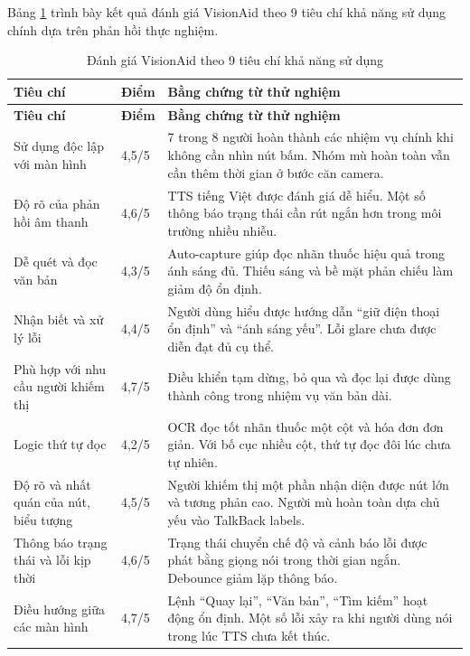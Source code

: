 \documentclass[a4paper,13pt]{report}
\begin{document}
Bảng \ref{tab:usability-criteria} trình bày kết quả đánh giá VisionAid theo 9 tiêu chí khả năng sử dụng chính dựa trên phản hồi thực nghiệm.

\begin{longtable}{p{}p{}p{}}
\caption{Đánh giá VisionAid theo 9 tiêu chí khả năng sử dụng} \label{tab:usability-criteria} \\
\toprule
\textbf{Tiêu chí} & \textbf{Điểm} & \textbf{Bằng chứng từ thử nghiệm} \\
\midrule
\endfirsthead
\toprule
\textbf{Tiêu chí} & \textbf{Điểm} & \textbf{Bằng chứng từ thử nghiệm} \\
\midrule
\endhead
Sử dụng độc lập với màn hình & 4,5/5 & 7 trong 8 người hoàn thành các nhiệm vụ chính khi không cần nhìn nút bấm. Nhóm mù hoàn toàn vẫn cần thêm thời gian ở bước căn camera. \\ \hline
Độ rõ của phản hồi âm thanh & 4,6/5 & TTS tiếng Việt được đánh giá dễ hiểu. Một số thông báo trạng thái cần rút ngắn hơn trong môi trường nhiều nhiễu. \\ \hline
Dễ quét và đọc văn bản & 4,3/5 & Auto-capture giúp đọc nhãn thuốc hiệu quả trong ánh sáng đủ. Thiếu sáng và bề mặt phản chiếu làm giảm độ ổn định. \\ \hline
Nhận biết và xử lý lỗi & 4,4/5 & Người dùng hiểu được hướng dẫn ``giữ điện thoại ổn định'' và ``ánh sáng yếu''. Lỗi glare chưa được diễn đạt đủ cụ thể. \\ \hline
Phù hợp với nhu cầu người khiếm thị & 4,7/5 & Điều khiển tạm dừng, bỏ qua và đọc lại được dùng thành công trong nhiệm vụ văn bản dài. \\ \hline
Logic thứ tự đọc & 4,2/5 & OCR đọc tốt nhãn thuốc một cột và hóa đơn đơn giản. Với bố cục nhiều cột, thứ tự đọc đôi lúc chưa tự nhiên. \\ \hline
Độ rõ và nhất quán của nút, biểu tượng & 4,5/5 & Người khiếm thị một phần nhận diện được nút lớn và tương phản cao. Người mù hoàn toàn dựa chủ yếu vào TalkBack labels. \\ \hline
Thông báo trạng thái và lỗi kịp thời & 4,6/5 & Trạng thái chuyển chế độ và cảnh báo lỗi được phát bằng giọng nói trong thời gian ngắn. Debounce giảm lặp thông báo. \\ \hline
Điều hướng giữa các màn hình & 4,7/5 & Lệnh ``Quay lại'', ``Văn bản'', ``Tìm kiếm'' hoạt động ổn định. Một số lỗi xảy ra khi người dùng nói trong lúc TTS chưa kết thúc. \\
\bottomrule
\end{longtable}
\end{document}
